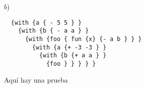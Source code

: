 $b$) \begin{lstlisting}
  {with {a { - 5 5 } }
    {with {b { - a a } }
      {with {foo { fun {x} {- a b } } }
        {with {a {+ -3 -3 } }
          {with {b {+ a a } }
            {foo } } } } }
\end{lstlisting} 

\begin{multicols}{2}
  Aquí hay una prueba
\end{multicols}
